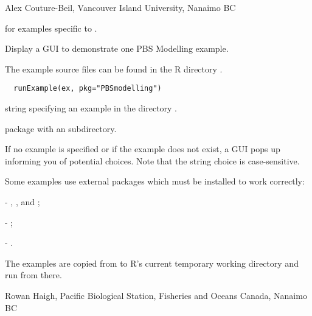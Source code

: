 \documentclass[letterpaper]{book}
\begin{document}
%
\begin{Author}\relax
Alex Couture-Beil, Vancouver Island University, Nanaimo BC
\end{Author}
%
\begin{SeeAlso}\relax
{}  for examples specific to .
\end{SeeAlso}
%
\begin{Description}\relax
Display a GUI to demonstrate one PBS Modelling example.

The example source files can be found in the R directory 
.
\end{Description}
%
\begin{Usage}
\begin{verbatim}
  runExample(ex, pkg="PBSmodelling")
\end{verbatim}
\end{Usage}
%
\begin{Arguments}
\begin{ldescription}
\item[\code{ex}] string specifying an example in the  directory . 
\item[\code{pkg}] package with an  subdirectory. 
\end{ldescription}
\end{Arguments}
%
\begin{Details}\relax
If no example is specified or if the example does not exist, a GUI pops up
informing you of potential choices. Note that the string choice is case-sensitive.

Some examples use external packages which must be installed to work correctly:

 - , , and ;

 - ;

 - .
\end{Details}
%
\begin{Note}\relax
The examples are copied from  to R's current 
temporary working directory and run from there.
\end{Note}
%
\begin{Author}\relax
Rowan Haigh, Pacific Biological Station, Fisheries and Oceans Canada, Nanaimo BC
\end{Author}
\end{document}
